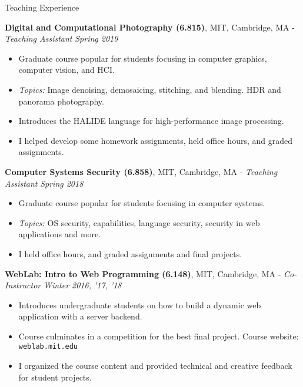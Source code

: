\documentclass{resume}
\begin{document}
\begin{area}{Teaching Experience}
    \item
        \textbf{Digital and Computational Photography (6.815)}, MIT, Cambridge, MA - \emph{Teaching Assistant} \hfill \emph{Spring 2019}
        \begin{itemize}
            \item Graduate course popular for students focusing in computer graphics, computer vision, and HCI.
            \item \emph{Topics:} Image denoising, demosaicing, stitching, and blending. HDR and panorama photography.
            \item Introduces the HALIDE language for high-performance image processing.
            \item I helped develop some homework assignments, held office hours, and graded assignments.
        \end{itemize}
    \item
        \textbf{Computer Systems Security (6.858)}, MIT, Cambridge, MA - \emph{Teaching Assistant} \hfill \emph{Spring 2018}
        \begin{itemize}
            \item Graduate course popular for students focusing in computer systems.
            \item \emph{Topics:} OS security, capabilities, language security, security in web applications and more.
            \item I held office hours, and graded assignments and final projects.
        \end{itemize}
    \item
        \textbf{WebLab: Intro to Web Programming (6.148)}, MIT, Cambridge, MA - \emph{Co-Instructor} \hfill \emph{Winter 2016, '17, '18}
        \begin{itemize}
            \item Introduces undergraduate students on how to build a dynamic web application with a server backend.
            \item Course culminates in a competition for the best final project. Course website: \texttt{weblab.mit.edu}
            \item I organized the course content and provided technical and creative feedback for student projects.
        \end{itemize}
\end{area}
\end{document}
